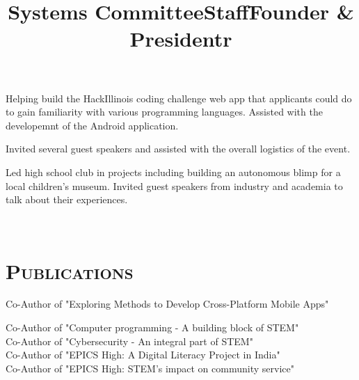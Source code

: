\begin{resume}
\title{Systems Committee}
\begin{position}
Helping build the HackIllinois coding challenge web app that applicants could do to gain familiarity with various programming languages. Assisted with the developemnt of the Android application.
\end{position}

\title{Staff}
\begin{position}
Invited several guest speakers and assisted with the overall logistics of the event.
\end{position}

\title{Founder \& President}
\begin{position}
Led high school club in projects including building an autonomous blimp for a local children's museum. Invited guest speakers from industry and academia to talk about their experiences.
\end{position}

\begin{formatb}
  \title{r}\\
\end{formatb}

\section{\textsc{Publications}}

\title{}
\begin{position}
Co-Author of "Exploring Methods to Develop Cross-Platform Mobile Apps"
\end{position}

\title{}
\begin{position}
Co-Author of "Computer programming - A building block of STEM" \\
Co-Author of "Cybersecurity - An integral part of STEM" \\
Co-Author of "EPICS High: A Digital Literacy Project in India" \\
Co-Author of "EPICS High: STEM's impact on community service"
\end{position}

\end{resume}

